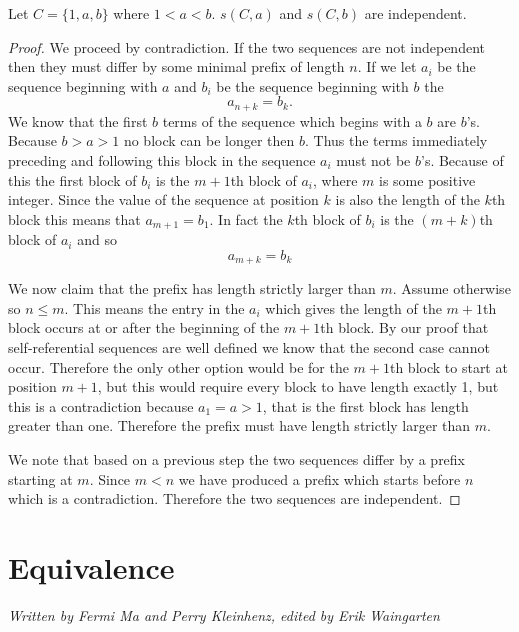 \documentclass[runningheads,a4paper]{llncs}
\begin{document}
\begin{theorem}
\label{independentsequences}
Let $C = \{ 1, a, b\}$ where $1<a<b$. $s(C, a)$ and $s(C, b)$ are independent.
\end{theorem}
\begin{proof}
We proceed by contradiction. If the two sequences are not independent then they must differ by some minimal prefix of length $n$. If we let $a_i$ be the sequence beginning with $a$ and $b_i$ be the sequence beginning with $b$ the
\begin{equation*}
a_{n+k} = b_{k}.
\end{equation*}
We know that the first $b$ terms of the sequence which begins with a $b$ are $b$'s. Because $b>a>1$ no block can be longer then $b$. Thus the terms immediately preceding and following this block in the sequence $a_i$ must not be $b$'s. Because of this the first block of $b_i$ is the $m+1$th block of $a_i$, where $m$ is some positive integer. Since the value of the sequence at position $k$ is also the length of the $k$th block this means that $a_{m+1}=b_1$. In fact the $k$th block of $b_i$ is the $(m+k)$th block of $a_i$ and so 
\begin{equation*}
a_{m+k} = b_k
\end{equation*}

We now claim that the prefix has length strictly larger than $m$. Assume otherwise so $n \leq m$. 
This means the entry in the $a_i$ which gives the length of the $m+1$th block occurs at or after the beginning of the $m+1$th block. By our proof that self-referential sequences are well defined we know that the second case cannot occur. Therefore the only other option would be for the $m+1$th block to start at position $m+1$, but this would require every block to have length exactly 1, but this is a contradiction because $a_1=a>1$, that is the first block has length greater than one. Therefore the prefix must have length strictly larger than $m$. 

We note that based on a previous step the two sequences differ by a prefix starting at $m$. Since $m<n$ we have produced a prefix which starts before $n$ which is a contradiction. Therefore the two sequences are independent. 
\end{proof}

\section{Equivalence}
\label{equivalence}
\emph{Written by Fermi Ma and Perry Kleinhenz, edited by Erik Waingarten}
\end{document}
